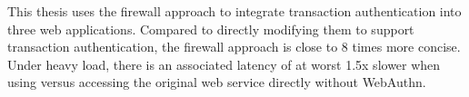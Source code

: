 
This thesis uses the firewall approach to integrate transaction authentication into three web applications. Compared to directly modifying them to support transaction authentication, the firewall approach is close to 8 times more concise. Under heavy load, there is an associated latency of at worst 1.5x slower when using \sys{} versus accessing the original web service directly without WebAuthn.

